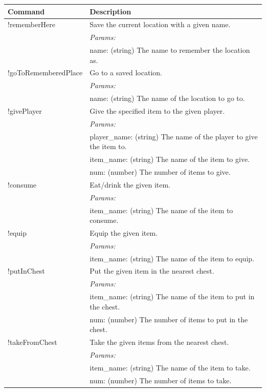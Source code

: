 \documentclass{article}
\begin{document}
\begin{table}[]
    \centering
    \begin{tabular}{|p{}|p{}|}
         \hline
    \textbf{Command} & \textbf{Description} \\
    \hline
    !rememberHere & Save the current location with a given name. \\
    & \textit{Params:} \\
    & name: (string) The name to remember the location as. \\
    \hline
    !goToRememberedPlace & Go to a saved location. \\
    & \textit{Params:} \\
    & name: (string) The name of the location to go to. \\
    \hline
    !givePlayer & Give the specified item to the given player. \\
    & \textit{Params:} \\
    & player\_name: (string) The name of the player to give the item to. \\
    & item\_name: (string) The name of the item to give. \\
    & num: (number) The number of items to give. \\
    \hline
    !consume & Eat/drink the given item. \\
    & \textit{Params:} \\
    & item\_name: (string) The name of the item to consume. \\
    \hline
    !equip & Equip the given item. \\
    & \textit{Params:} \\
    & item\_name: (string) The name of the item to equip. \\
    \hline
    !putInChest & Put the given item in the nearest chest. \\
    & \textit{Params:} \\
    & item\_name: (string) The name of the item to put in the chest. \\
    & num: (number) The number of items to put in the chest. \\
    \hline
    !takeFromChest & Take the given items from the nearest chest. \\
    & \textit{Params:} \\
    & item\_name: (string) The name of the item to take. \\
    & num: (number) The number of items to take. \\

\end{tabular}
\end{table}
\end{document}
